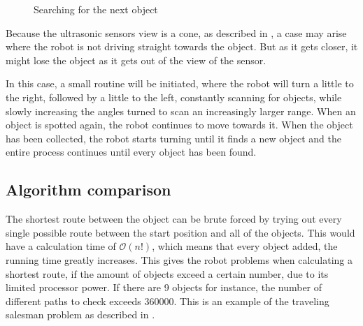 \begin{figure}[H]
     \caption{\label{fig:object_navigation_niv2} Searching for the next object}
\end{figure} 

Because the ultrasonic sensors view is a cone, as described in , a case may arise where the robot is not driving straight towards the object. But as it gets closer, it might lose the object as it gets out of the view of the sensor.

In this case, a small routine will be initiated, where the robot will turn a little to the right, followed by a little to the left, constantly scanning for objects, while slowly increasing the angles turned to scan an increasingly larger range. When an object is spotted again, the robot continues to move towards it. When the object has been collected, the robot starts turning until it finds a new object and the entire process continues until every object has been found.


\subsection{Algorithm comparison} \label{sec:algorithm-desc}

The shortest route between the object can be brute forced by trying out every single possible route between the start position and all of the objects.  This would have a calculation time of $\mathcal{O}(n!)$, which means that every object added, the running time greatly increases. This gives the robot problems when calculating a shortest route, if the amount of objects exceed a certain number, due to its limited processor power. If there are 9 objects for instance, the number of different paths to check exceeds 360000. This is an example of the traveling salesman problem as described in .

